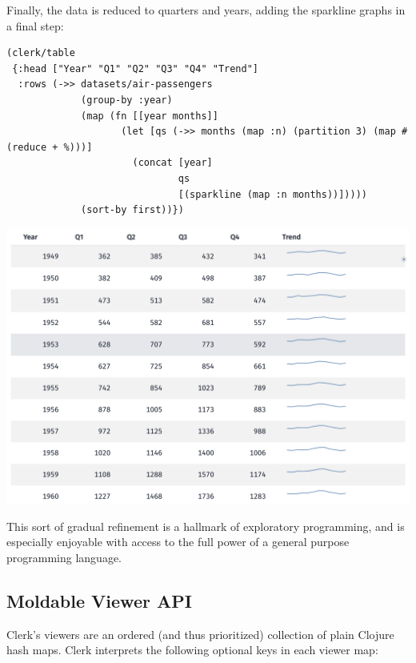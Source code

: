 \documentclass[sigconf,screen]{acmart}
\begin{document}
Finally, the data is reduced to quarters and years, adding the sparkline graphs in a final step:

\begin{minipage}{\linewidth}
\begin{lstlisting}
(clerk/table
 {:head ["Year" "Q1" "Q2" "Q3" "Q4" "Trend"]
  :rows (->> datasets/air-passengers
             (group-by :year)
             (map (fn [[year months]]
                    (let [qs (->> months (map :n) (partition 3) (map #(reduce + %)))]
                      (concat [year] 
                              qs 
                              [(sparkline (map :n months))]))))
             (sort-by first))})
\end{lstlisting}
\end{minipage}

\includegraphics{images/anon-expr-5dsSs4YJ9LYoxsu8USvFMpW5wGuDa3-result.png}

This sort of gradual refinement is a hallmark of exploratory programming, and is especially enjoyable with access to the full power of a general purpose programming language.

\hypertarget{moldable-viewer-api}{%
\subsection{Moldable Viewer API}\label{moldable-viewer-api}}

Clerk's viewers are an ordered (and thus prioritized) collection of plain Clojure hash maps. Clerk interprets the following optional keys in each viewer map:
\end{document}
